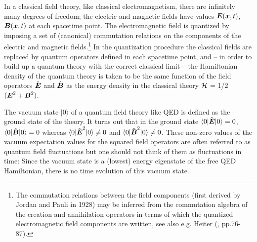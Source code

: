 \documentclass[12pt]{article}
\newcommand{\BFACE}[1] {\mbox{\boldmath $#1$} }
\begin{document}
In a classical field theory, like classical electromagnetism,
there are infinitely many degrees of freedom; the electric and
magnetic fields have values ${\BFACE{E}} ({\BFACE{x}}, t)$,
${\BFACE{B}} ({\BFACE{x}}, t)$ at each spacetime point. The
electromagnetic field is quantized by imposing a set of
(canonical) commutation relations on the components of the
electric and magnetic fields.\footnote{The commutation relations
between the field components (first derived by Jordan and Pauli in
1928) may be inferred from the commutation algebra of the creation
and annihilation operators in terms of which the quantized
electromagnetic field components are written, see also e.g. Heiter
(\cite{heitler54}, pp.76-87).} In the quantization procedure
the classical fields are replaced by quantum operators defined in
each spacetime point, and -- in order to build up a quantum
theory with the correct classical limit -- the Hamiltonian density
of the quantum theory is taken to be the same function of the
field operators $\hat{{\BFACE{E}}}$ and $\hat{{\BFACE{B}}}$ as the
energy density in the classical theory ${\cal H}$ = 1/2
$({{\BFACE{E}}}^2 + {{\BFACE{B}}}^2 ) $. 

The vacuum state $|0 \rangle $ of a quantum field theory like QED
is defined as the ground state of the 
theory. It turns out that in the ground state 
$\langle 0| \hat{{\BFACE{E}}} |0 \rangle  = 0$,   
$\langle 0|\hat{{\BFACE{B}}} |0 \rangle  = 0 $ whereas
$\langle 0|\hat{{\BFACE{E}}}^2 |0 \rangle  \neq 0$ and   
$\langle 0|\hat{{\BFACE{B}}}^2 |0 \rangle  \neq 0$.
These non-zero values of the vacuum expectation values for the squared
field operators are often referred to as quantum field
fluctuations but one should not think of them as fluctuations in time: 
Since the vacuum state is a (lowest) energy eigenstate of the free QED 
Hamiltonian, there is no time evolution of this vacuum state.  
\end{document}
